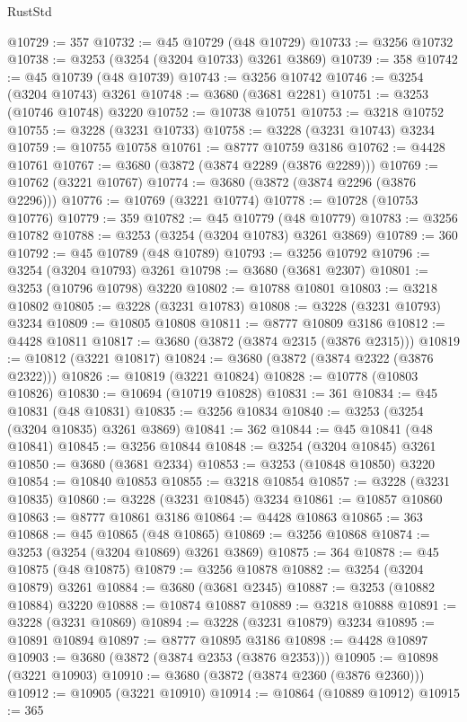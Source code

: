 \begin{lexlean}{RustStd}
\begin{coremodule}
@10729 := 357
@10732 := @45 @10729 (@48 @10729)
@10733 := @3256 @10732
@10738 := @3253 (@3254 (@3204 @10733) @3261 @3869)
@10739 := 358
@10742 := @45 @10739 (@48 @10739)
@10743 := @3256 @10742
@10746 := @3254 (@3204 @10743) @3261
@10748 := @3680 (@3681 @2281)
@10751 := @3253 (@10746 @10748) @3220
@10752 := @10738 @10751
@10753 := @3218 @10752
@10755 := @3228 (@3231 @10733)
@10758 := @3228 (@3231 @10743) @3234
@10759 := @10755 @10758
@10761 := @8777 @10759 @3186
@10762 := @4428 @10761
@10767 := @3680 (@3872 (@3874 @2289 (@3876 @2289)))
@10769 := @10762 (@3221 @10767)
@10774 := @3680 (@3872 (@3874 @2296 (@3876 @2296)))
@10776 := @10769 (@3221 @10774)
@10778 := @10728 (@10753 @10776)
@10779 := 359
@10782 := @45 @10779 (@48 @10779)
@10783 := @3256 @10782
@10788 := @3253 (@3254 (@3204 @10783) @3261 @3869)
@10789 := 360
@10792 := @45 @10789 (@48 @10789)
@10793 := @3256 @10792
@10796 := @3254 (@3204 @10793) @3261
@10798 := @3680 (@3681 @2307)
@10801 := @3253 (@10796 @10798) @3220
@10802 := @10788 @10801
@10803 := @3218 @10802
@10805 := @3228 (@3231 @10783)
@10808 := @3228 (@3231 @10793) @3234
@10809 := @10805 @10808
@10811 := @8777 @10809 @3186
@10812 := @4428 @10811
@10817 := @3680 (@3872 (@3874 @2315 (@3876 @2315)))
@10819 := @10812 (@3221 @10817)
@10824 := @3680 (@3872 (@3874 @2322 (@3876 @2322)))
@10826 := @10819 (@3221 @10824)
@10828 := @10778 (@10803 @10826)
@10830 := @10694 (@10719 @10828)
@10831 := 361
@10834 := @45 @10831 (@48 @10831)
@10835 := @3256 @10834
@10840 := @3253 (@3254 (@3204 @10835) @3261 @3869)
@10841 := 362
@10844 := @45 @10841 (@48 @10841)
@10845 := @3256 @10844
@10848 := @3254 (@3204 @10845) @3261
@10850 := @3680 (@3681 @2334)
@10853 := @3253 (@10848 @10850) @3220
@10854 := @10840 @10853
@10855 := @3218 @10854
@10857 := @3228 (@3231 @10835)
@10860 := @3228 (@3231 @10845) @3234
@10861 := @10857 @10860
@10863 := @8777 @10861 @3186
@10864 := @4428 @10863
@10865 := 363
@10868 := @45 @10865 (@48 @10865)
@10869 := @3256 @10868
@10874 := @3253 (@3254 (@3204 @10869) @3261 @3869)
@10875 := 364
@10878 := @45 @10875 (@48 @10875)
@10879 := @3256 @10878
@10882 := @3254 (@3204 @10879) @3261
@10884 := @3680 (@3681 @2345)
@10887 := @3253 (@10882 @10884) @3220
@10888 := @10874 @10887
@10889 := @3218 @10888
@10891 := @3228 (@3231 @10869)
@10894 := @3228 (@3231 @10879) @3234
@10895 := @10891 @10894
@10897 := @8777 @10895 @3186
@10898 := @4428 @10897
@10903 := @3680 (@3872 (@3874 @2353 (@3876 @2353)))
@10905 := @10898 (@3221 @10903)
@10910 := @3680 (@3872 (@3874 @2360 (@3876 @2360)))
@10912 := @10905 (@3221 @10910)
@10914 := @10864 (@10889 @10912)
@10915 := 365

\end{coremodule}
\end{lexlean}
